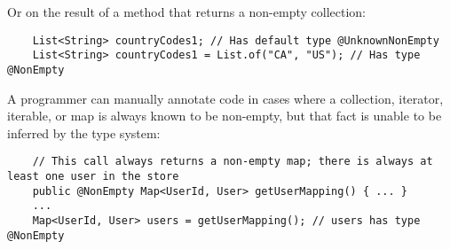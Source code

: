Or on the result of a method that returns a non-empty collection:

\begin{Verbatim}
    List<String> countryCodes1; // Has default type @UnknownNonEmpty
    List<String> countryCodes1 = List.of("CA", "US"); // Has type @NonEmpty
\end{Verbatim}

A programmer can manually annotate code in cases where a collection,
iterator, iterable, or map is always known to be non-empty, but that fact is
unable to be inferred by the type system:

\begin{Verbatim}
    // This call always returns a non-empty map; there is always at least one user in the store
    public @NonEmpty Map<UserId, User> getUserMapping() { ... }
    ...
    Map<UserId, User> users = getUserMapping(); // users has type @NonEmpty
\end{Verbatim}


